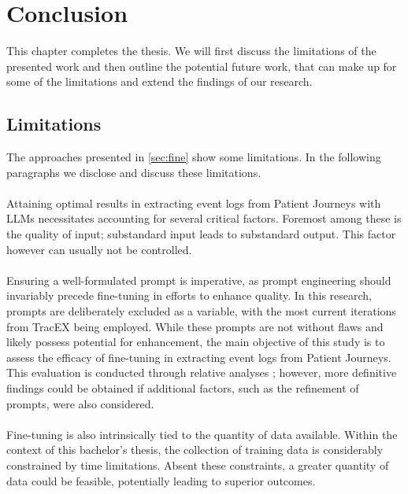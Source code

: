 \section{Conclusion}\label{sec:conclusion}
This chapter completes the thesis. We will first discuss the limitations of the presented work and then outline the potential future work, that can make up for some of the limitations and extend the findings of our research.

\subsection{Limitations}\label{sec:limitations}
The approaches presented in \autoref{sec:fine} show some limitations. In the following paragraphs we disclose and discuss these limitations.\\\\
Attaining optimal results in extracting event logs from Patient Journeys with LLMs necessitates accounting for several critical factors. Foremost among these is the quality of input; substandard input leads to substandard output. This factor however can usually not be controlled.\\\\
Ensuring a well-formulated prompt is imperative, as prompt engineering should invariably precede fine-tuning in efforts to enhance quality.
In this research, prompts are deliberately excluded as a variable, with the most current iterations from TracEX being employed. While these prompts are not without flaws and likely possess potential for enhancement, the main objective of this study is to assess the efficacy of fine-tuning in extracting event logs from Patient Journeys. This evaluation is conducted through relative analyses ; however, more definitive findings could be obtained if additional factors, such as the refinement of prompts, were also considered.\\\\
Fine-tuning is also intrinsically tied to the quantity of data available. Within the context of this bachelor’s thesis, the collection of training data is considerably constrained by time limitations. Absent these constraints, a greater quantity of data could be feasible, potentially leading to superior outcomes.\\\\

